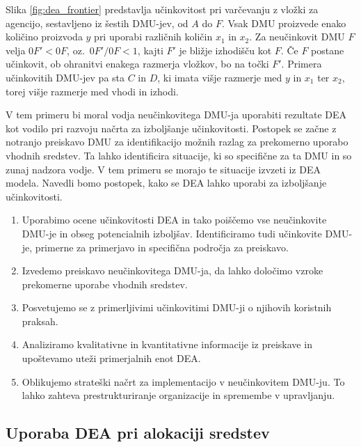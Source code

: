 \documentclass[12pt,a4paper]{article}
\theoremstyle{definition}
\begin{document}
Slika \ref{fig:dea_frontier} predstavlja učinkovitost pri 
varčevanju z vložki za agencijo, sestavljeno iz šestih
DMU-jev, od $A$ do $F$. Vsak DMU proizvede enako količino
proizvoda $y$ pri uporabi različnih količin $x_1$ in $x_2$.
Za neučinkovit DMU $F$ velja $0F' < 0F$, oz.\ $0F'/0F < 1$,
kajti $F'$ je bližje izhodišču kot $F$. Če $F$ postane 
učinkovit, ob ohranitvi enakega razmerja vložkov, bo
na točki $F'$. Primera učinkovitih DMU-jev pa sta $C$
in $D$, ki imata višje razmerje med $y$ in $x_1$ ter
$x_2$, torej višje razmerje med vhodi in izhodi.

V tem primeru bi moral vodja neučinkovitega DMU-ja uporabiti
rezultate DEA kot vodilo pri razvoju načrta za izboljšanje
učinkovitosti. Postopek se začne z notranjo preiskavo DMU
za identifikacijo možnih razlag za prekomerno uporabo vhodnih sredstev.
Ta lahko identificira situacije, ki so specifične za ta DMU
in so zunaj nadzora vodje. V tem primeru se morajo te situacije
izvzeti iz DEA modela. Navedli bomo postopek, kako se DEA
lahko uporabi za izboljšanje učinkovitosti. \cite{Yaisawarng2002}
\newpage

\begin{enumerate}
    \item Uporabimo ocene učinkovitosti DEA in tako poiščemo
    vse neučinkovite DMU-je in obseg potencialnih izboljšav. 
    Identificiramo tudi učinkovite DMU-je, primerne za 
    primerjavo in specifična področja za preiskavo.
    
    \item Izvedemo preiskavo neučinkovitega 
    DMU-ja, da lahko določimo vzroke prekomerne 
    uporabe vhodnih sredstev.
    
    \item Posvetujemo se z primerljivimi učinkovitimi DMU-ji
    o njihovih koristnih praksah.
    
    \item Analiziramo kvalitativne in kvantitativne informacije
    iz preiskave in upoštevamo uteži primerjalnih enot DEA.
    
    \item Oblikujemo strateški načrt za implementacijo v 
    neučinkovitem DMU-ju. To lahko zahteva prestrukturiranje 
    organizacije in spremembe v upravljanju. \cite{Yaisawarng2002}
\end{enumerate}

\subsection{Uporaba DEA pri alokaciji sredstev}
\end{document}
